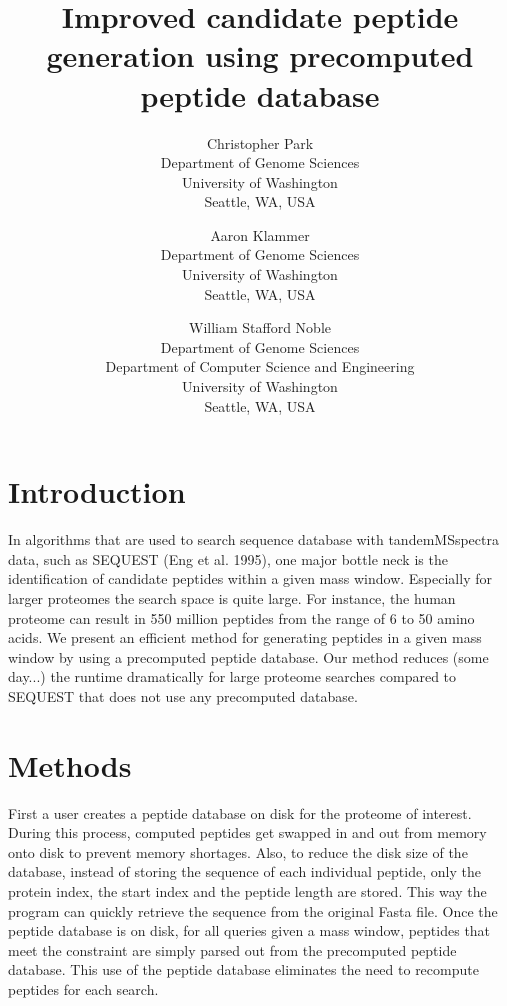 \documentclass{article}
\begin{document}
\title{Improved candidate peptide generation using precomputed peptide
database}

\author{
Christopher Park\\
Department of Genome Sciences\\
University of Washington\\
Seattle, WA, USA
\and
Aaron Klammer\\
Department of Genome Sciences\\
University of Washington\\
Seattle, WA, USA
\and
William Stafford Noble\\
Department of Genome Sciences\\
Department of Computer Science and Engineering\\
University of Washington\\
Seattle, WA, USA
}

\maketitle

\section{Introduction}

In algorithms that are used to search sequence database with
tandemMSspectra data,  such as SEQUEST (Eng et al. 1995), one major
bottle neck is the identification of  candidate peptides within a
given mass window. Especially for larger proteomes the  search space
is quite large. For instance, the human proteome can result in 550
million  peptides from the range of 6 to 50 amino acids. We present an
efficient method for  generating peptides in a given mass window by
using a precomputed peptide  database. Our method reduces (some
day...) the runtime dramatically for large  proteome searches compared
to SEQUEST that does not use any precomputed  database. 

\section{Methods}

First a user creates a peptide database on disk for the proteome of
interest. During this  process, computed peptides get swapped in and
out from memory onto disk to prevent  memory shortages. Also, to
reduce the disk size of the database, instead of storing the  sequence
of each individual peptide, only the protein index, the start index
and the  peptide length are stored. This way the program can quickly
retrieve the sequence  from the original Fasta file. Once the peptide
database is on disk, for all queries given a mass window,  peptides
that meet the constraint are simply parsed out from the precomputed
peptide  database. This use of the peptide database eliminates the
need to recompute peptides  for each search.
\end{document}
